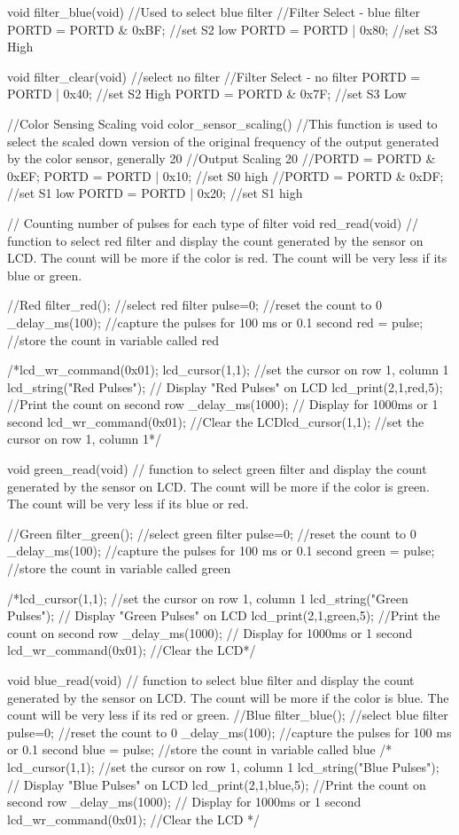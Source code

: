 void filter_blue(void)	//Used to select blue filter
{
	//Filter Select - blue filter
	PORTD = PORTD & 0xBF; //set S2 low
	PORTD = PORTD | 0x80; //set S3 High
}

void filter_clear(void)	//select no filter
{
	//Filter Select - no filter
	PORTD = PORTD | 0x40; //set S2 High
	PORTD = PORTD & 0x7F; //set S3 Low
}

//Color Sensing Scaling
void color_sensor_scaling()		//This function is used to select the scaled down version of the original frequency of the output generated by the color sensor, generally 20%
{
	//Output Scaling 20%
	//PORTD = PORTD & 0xEF;
	PORTD = PORTD | 0x10; //set S0 high
	//PORTD = PORTD & 0xDF; //set S1 low
	PORTD = PORTD | 0x20; //set S1 high
}

// Counting number of pulses for each type of filter
void red_read(void) // function to select red filter and display the count generated by the sensor on LCD. The count will be more if the color is red. The count will be very less if its blue or green.
{
	//Red
	filter_red(); //select red filter
	pulse=0; //reset the count to 0
	_delay_ms(100); //capture the pulses for 100 ms or 0.1 second
	red = pulse;  //store the count in variable called red
	
	/*lcd_wr_command(0x01);
	lcd_cursor(1,1);  //set the cursor on row 1, column 1
	lcd_string("Red Pulses"); // Display "Red Pulses" on LCD
	lcd_print(2,1,red,5);  //Print the count on second row
	_delay_ms(1000);	// Display for 1000ms or 1 second
	lcd_wr_command(0x01); //Clear the LCDlcd_cursor(1,1);  //set the cursor on row 1, column 1*/
}

void green_read(void) // function to select green filter and display the count generated by the sensor on LCD. The count will be more if the color is green. The count will be very less if its blue or red.
{
	//Green
	filter_green(); //select green filter
	pulse=0; //reset the count to 0
	_delay_ms(100); //capture the pulses for 100 ms or 0.1 second
	green = pulse;  //store the count in variable called green
	
	/*lcd_cursor(1,1);  //set the cursor on row 1, column 1
	lcd_string("Green Pulses"); // Display "Green Pulses" on LCD
	lcd_print(2,1,green,5);  //Print the count on second row
	_delay_ms(1000);	// Display for 1000ms or 1 second
	lcd_wr_command(0x01); //Clear the LCD*/
}

void blue_read(void) // function to select blue filter and display the count generated by the sensor on LCD. The count will be more if the color is blue. The count will be very less if its red or green.
{
	//Blue
	filter_blue(); //select blue filter
	pulse=0; //reset the count to 0
	_delay_ms(100); //capture the pulses for 100 ms or 0.1 second
	blue = pulse;  //store the count in variable called blue
	/*
	lcd_cursor(1,1);  //set the cursor on row 1, column 1
	lcd_string("Blue Pulses"); // Display "Blue Pulses" on LCD
	lcd_print(2,1,blue,5);  //Print the count on second row
	_delay_ms(1000);	// Display for 1000ms or 1 second
	lcd_wr_command(0x01); //Clear the LCD
	*/
}


